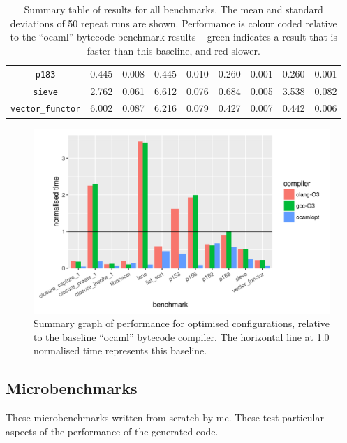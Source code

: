 \documentclass[12pt,a4paper,twoside,openright]{report}
\begin{document}
\begin{table}[h]
\begin{tabular}{| c | c c | c c | c c | c c |}
\lstinline!p183!              & \cellcolor[hsb]{0.3,0.000,1}0.445 & 0.008 & \cellcolor[hsb]{0.3,0.000,1}0.445 & 0.010 & \cellcolor[hsb]{0.3,0.416,1}0.260 & 0.001 & \cellcolor[hsb]{0.3,0.416,1}0.260 & 0.001 \\
\lstinline!sieve!             & \cellcolor[hsb]{0.3,0.000,1}2.762 & 0.061 & \cellcolor[hsb]{0.0,0.697,1}6.612 & 0.076 & \cellcolor[hsb]{0.3,0.752,1}0.684 & 0.005 & \cellcolor[hsb]{0.0,0.141,1}3.538 & 0.082 \\
\lstinline!vector_functor!    & \cellcolor[hsb]{0.3,0.000,1}6.002 & 0.087 & \cellcolor[hsb]{0.0,0.018,1}6.216 & 0.079 & \cellcolor[hsb]{0.3,0.929,1}0.427 & 0.007 & \cellcolor[hsb]{0.3,0.926,1}0.442 & 0.006 \\
\hline
\end{tabular}

\caption{Summary table of results for all benchmarks. The mean and standard deviations of 50 repeat runs are shown. Performance is colour coded relative to the ``ocaml'' bytecode benchmark results -- green indicates a result that is faster than this baseline, and red slower.}\label{benchmark-table}
\end{table}

\begin{figure}
\centering
  \includegraphics[width=16cm]{resultsummary-b477d4580}

\caption{Summary graph of performance for optimised configurations, relative to
the baseline ``ocaml'' bytecode compiler. The horizontal line at 1.0 normalised
time represents this baseline.}\label{graph-summary}
\end{figure}

\subsection{Microbenchmarks}
These microbenchmarks written from scratch by me. These test particular aspects
of the performance of the generated code.
\end{document}
